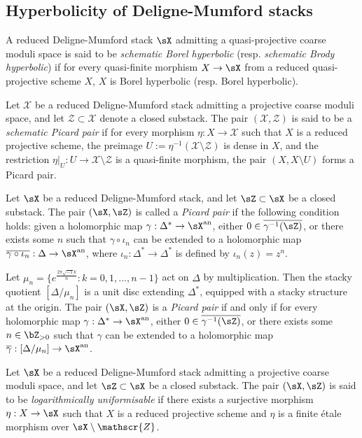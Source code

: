 \documentclass[11pt,letterpaper]{amsart}
\numberwithin{equation}{section}
\begin{document}
	\subsection{Hyperbolicity of Deligne-Mumford stacks}
	\begin{defn}
		A reduced Deligne-Mumford stack $\sX$ admitting a quasi-projective coarse moduli space is said to be \emph{schematic Borel hyperbolic} (resp. \emph{schematic Brody hyperbolic}) if for every quasi-finite morphism $X\to\sX$ from a reduced quasi-projective scheme $X$, $X$ is Borel hyperbolic (resp. Borel hyperbolic). 
		
		Let $\mathscr{X}$ be a reduced Deligne-Mumford stack admitting a projective coarse moduli space, and let $\mathscr{Z} \subset \mathscr{X}$ denote a closed substack. The pair $(\mathscr{X}, \mathscr{Z})$ is said to be a \emph{schematic Picard pair} if for every morphism $\eta: X \to \mathscr{X}$ such that $X$ is a reduced projective scheme, the preimage $U := \eta^{-1}(\mathscr{X} \setminus \mathscr{Z})$ is dense in $X$, and the restriction $\eta|_U: U \to \mathscr{X} \setminus \mathscr{Z}$ is a quasi-finite morphism, the pair $(X, X \setminus U)$ forms a Picard pair.
	\end{defn}
	\begin{defn}
		Let $\sX$ be a reduced Deligne-Mumford stack, and let $\sZ \subset \sX$ be a closed substack. The pair $(\sX, \sZ)$ is called a \emph{Picard pair} if the following condition holds: given a holomorphic map $\gamma: \Delta^\ast \to \sX^{\rm an}$, either $0 \in \overline{\gamma^{-1}(\sZ)}$, or there exists some $n$ such that $\gamma \circ \iota_n$ can be extended to a holomorphic map $\overline{\gamma \circ \iota_n}: \Delta \to \sX^{\rm an}$, where $\iota_n: \Delta^\ast \to \Delta^\ast$ is defined by $\iota_n(z) = z^n$.
	\end{defn}
	Let $\mu_n = \{e^{\frac{2\pi\sqrt{-1}k}{n}} : k = 0, 1, \dots, n-1\}$ act on $\Delta$ by multiplication. Then the stacky quotient $[\Delta / \mu_n]$ is a unit disc extending $\Delta^\ast$, equipped with a stacky structure at the origin. The pair $(\sX, \sZ)$ is a \emph{Picard pair} if and only if for every holomorphic map $\gamma: \Delta^\ast \to \sX^{\rm an}$, either $0 \in \overline{\gamma^{-1}(\sZ)}$, or there exists some $n \in \bZ_{>0}$ such that $\gamma$ can be extended to a holomorphic map $\overline{\gamma}: [\Delta / \mu_n] \to \sX^{\rm an}$.
	\begin{defn}\label{defn_log_uniformisable}
		Let $\sX$ be a reduced Deligne-Mumford stack admitting a projective coarse moduli space, and let $\sZ \subset \sX$ be a closed substack. The pair $(\sX, \sZ)$ is said to be \emph{logarithmically uniformisable} if there exists a surjective morphism $\eta: X \to \sX$ such that $X$ is a reduced projective scheme and $\eta$ is a finite \'etale morphism over $\sX \setminus \mathscr{Z}$.
	\end{defn}
\end{document}
